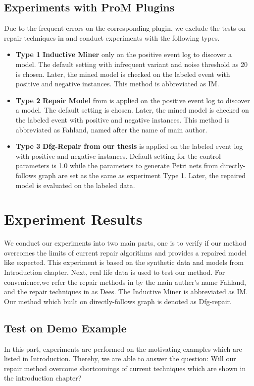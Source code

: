 \subsection{ Experiments with ProM Plugins}
Due to the frequent errors on the corresponding plugin, we exclude the tests on repair techniques in \cite{dees2017enhancing} and conduct experiments with the following types. 
\begin{itemize}
	\item \textbf{Type 1} \textbf{Inductive Miner} only on the positive event log to discover a model. The default setting with infrequent variant and noise threshold as 20 is chosen. Later, the mined model is checked on the labeled event with positive and negative instances. This method is abbreviated as IM.
	\item \textbf{Type 2} \textbf{Repair Model} from \cite{fahland2015model} is applied on the positive event log to discover a model. The default setting is chosen. Later, the mined model is checked on the labeled event with positive and negative instances. This method is abbreviated as Fahland, named after the name of main author.
	\item \textbf{Type 3} \textbf{Dfg-Repair from our thesis} is applied on the labeled event log with positive and negative instances. Default setting  for the control parameters is 1.0 while the parameters to generate Petri nets from directly-follows graph are set as the same as experiment Type 1.  Later, the repaired model is evaluated on the labeled data. 
\end{itemize}

\section{Experiment Results}
We conduct our experiments into two main parts, one is to verify if our method overcomes the limits of current repair algorithms and provides a repaired model like expected. This experiment is based on the synthetic data and models from Introduction chapter. Next, real life data is used to test our method. For convenience,we refer the repair methods in \cite{fahland2015model} by the main auther's name Fahland, and the repair techniques in \cite{dees2017enhancing} as Dees. The Inductive Miner is abbreviated as IM. Our method which built on directly-follows graph is denoted as Dfg-repair. 
 
\subsection{Test on Demo Example}
In this part, experiments are performed on the motivating examples which are listed in Introduction. Thereby, we are able to answer the question: Will our repair method overcome shortcomings of current techniques which are shown in the introduction chapter? 
